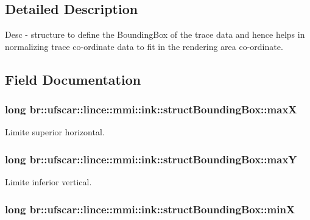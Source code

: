 \subsection{Detailed Description}
Desc -\/ structure to define the BoundingBox of the trace data and hence helps in normalizing trace co-\/ordinate data to fit in the rendering area co-\/ordinate. 

\subsection{Field Documentation}
\hypertarget{structbr_1_1ufscar_1_1lince_1_1mmi_1_1ink_1_1structBoundingBox_a65a9d52b3d44834668ec591c9593af24}{
\subsubsection[{maxX}]{\setlength{\rightskip}{0pt plus 5cm}long {\bf br::ufscar::lince::mmi::ink::structBoundingBox::maxX}}}
\label{structbr_1_1ufscar_1_1lince_1_1mmi_1_1ink_1_1structBoundingBox_a65a9d52b3d44834668ec591c9593af24}


Limite superior horizontal. 

\hypertarget{structbr_1_1ufscar_1_1lince_1_1mmi_1_1ink_1_1structBoundingBox_ae63289fbb7f7a17ac4e44837edf362d0}{
\subsubsection[{maxY}]{\setlength{\rightskip}{0pt plus 5cm}long {\bf br::ufscar::lince::mmi::ink::structBoundingBox::maxY}}}
\label{structbr_1_1ufscar_1_1lince_1_1mmi_1_1ink_1_1structBoundingBox_ae63289fbb7f7a17ac4e44837edf362d0}


Limite inferior vertical. 

\hypertarget{structbr_1_1ufscar_1_1lince_1_1mmi_1_1ink_1_1structBoundingBox_a0ee9f3312a600d5e18864edff981aff2}{
\subsubsection[{minX}]{\setlength{\rightskip}{0pt plus 5cm}long {\bf br::ufscar::lince::mmi::ink::structBoundingBox::minX}}}
\label{structbr_1_1ufscar_1_1lince_1_1mmi_1_1ink_1_1structBoundingBox_a0ee9f3312a600d5e18864edff981aff2}


